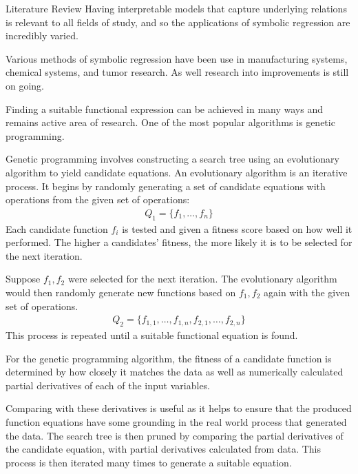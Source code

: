 \documentclass[12pt]{amsart}
\begin{document}
\begin{section}{Literature Review}
        Having interpretable models that capture underlying relations is relevant to all fields of study, and so the applications of symbolic regression are incredibly varied. 

        Various methods of symbolic regression have been use in manufacturing systems, chemical systems, and tumor research\cite{can2011comparison,keith2021combining,yoshihara2013inferring}. As well research into improvements is still on going.

        Finding a suitable functional expression can be achieved in many ways and remains active area of research. One of the most popular algorithms is genetic programming\cite{schmidt2009distilling}. 
        
        Genetic programming involves constructing a search tree using an evolutionary algorithm to yield candidate equations. An evolutionary algorithm is an iterative process. It begins by randomly generating a set of candidate equations with operations from the given set of operations:
        \begin{align}
            Q_1=\{f_1,\dots,f_n\}
        \end{align}
        Each candidate function $f_i$ is tested and given a fitness score based on how well it performed. The higher a candidates' fitness, the more likely it is to be selected for the next iteration.

        Suppose $f_1,f_2$ were selected for the next iteration. The evolutionary algorithm would then randomly generate new functions based on $f_1,f_2$ again with the given set of operations.
        \begin{align}
            Q_2=\{f_{1,1},\dots,f_{1,n}, f_{2,1},\dots,f_{2,n}\}
        \end{align}
        This process is repeated until a suitable functional equation is found. 

        For the genetic programming algorithm, the fitness of a candidate function is determined by how closely it matches the data as well as numerically calculated partial derivatives of each of the input variables. 
        
        Comparing with these derivatives is useful as it helps to ensure that the produced function equations have some grounding in the real world process that generated the data. The search tree is then pruned by comparing the partial derivatives of the candidate equation, with partial derivatives calculated from data. This process is then iterated many times to generate a suitable equation.


\end{section}
\end{document}
